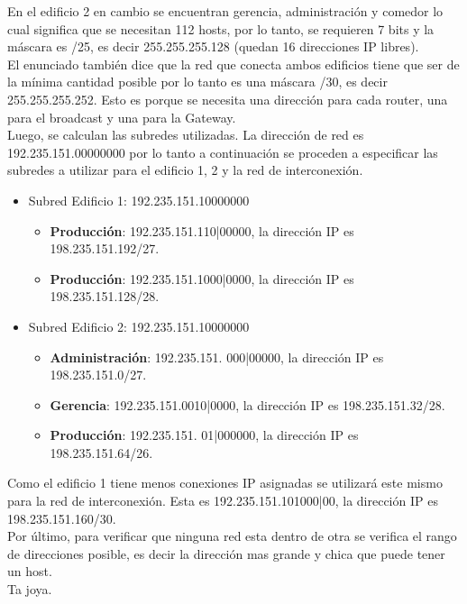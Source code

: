 En el edificio 2 en cambio se encuentran gerencia, administración y comedor lo cual significa que se necesitan 112 hosts, por lo tanto, se requieren 7 bits y la máscara es /25, es decir 255.255.255.128 (quedan 16 direcciones IP libres).\\

El enunciado también dice que la red que conecta ambos edificios tiene que ser de la mínima cantidad posible por lo tanto es una máscara /30, es decir 255.255.255.252. Esto es porque se necesita una dirección para cada router, una para el broadcast y una para la Gateway. \\

Luego, se calculan las subredes utilizadas. La dirección de red es 192.235.151.00000000 por lo tanto a continuación se proceden a especificar las subredes a utilizar para el edificio 1, 2 y la red de interconexión.\\

\begin{itemize}
    \item Subred Edificio 1: 192.235.151.10000000 
    \begin{itemize}
        \item \textbf{Producción}: 192.235.151.110|00000, la dirección IP es 198.235.151.192/27.
        \item \textbf{Producción}: 192.235.151.1000|0000, la dirección IP es 198.235.151.128/28.
    \end{itemize}
    \item Subred Edificio 2: 192.235.151.10000000 
    \begin{itemize}
        \item \textbf{Administración}: 192.235.151. 000|00000, la dirección IP es 198.235.151.0/27.
        \item \textbf{Gerencia}: 192.235.151.0010|0000, la dirección IP es 198.235.151.32/28.
        \item \textbf{Producción}: 192.235.151. 01|000000, la dirección IP es 198.235.151.64/26.
    \end{itemize}
\end{itemize}

Como el edificio 1 tiene menos conexiones IP asignadas se utilizará este mismo para la red de interconexión. Esta es 192.235.151.101000|00, la dirección IP es 198.235.151.160/30.\\

Por último, para verificar que ninguna red esta dentro de otra se verifica el rango de direcciones posible, es decir la dirección mas grande y chica que puede tener un host.\\


Ta joya.
